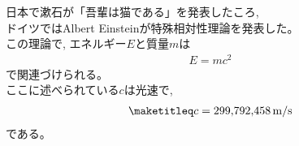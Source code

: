 \documentclass[fleqn,autodetect-engine,dvipdfmxi-if-dvi,ja=standard]{bxjsarticle}
\begin{document}
日本で漱石が「吾輩は猫である」を発表したころ,\\
ドイツではAlbert Einsteinが特殊相対性理論を発表した。\\

この理論で, エネルギー$E$と質量$m$は
\begin{eqnarray}
  E = mc^{2} \nonumber
\end{eqnarray}
で関連づけられる。\\
ここに述べられている$c$は光速で,
\begin{eqnarray}
\maketitleq
 c = 299{,}792{,}458\,\mathrm{m/s} \nonumber
\end{eqnarray}
である。
\end{document}

